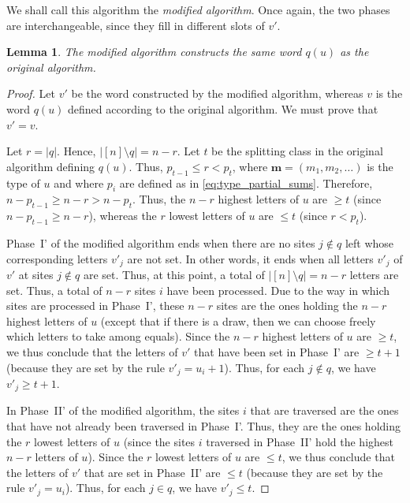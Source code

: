 \documentclass[reqno]{amsart}
\newcommand{\0}{\phantom{c}}
\newcommand{\mm}{\mathbf{m}}
\newcommand{\abs}[1]{\left| #1 \right|}
\newcommand{\tup}[1]{\left( #1 \right)}
\newcommand{\ive}[1]{\left[ #1 \right]}
\newcommand{\defn}[1]{{\color{darkred}\emph{#1}}} %
\theoremstyle{plain}
\newtheorem{lemma}[thm]{Lemma}
\theoremstyle{definition}
\numberwithin{equation}{section}
\begin{document}
We shall call this algorithm the \defn{modified algorithm}.
Once again, the two phases are interchangeable, since they fill in different slots of $v'$.

\begin{lemma}
  \label{le:modalg}
  The modified algorithm constructs the same word $q \tup{u}$ as the original algorithm.
\end{lemma}

\begin{proof}
Let $v'$ be the word constructed by the modified algorithm,
whereas $v$ is the word $q \tup{u}$ defined according to the original algorithm.
We must prove that $v' = v$.

Let $r = \abs{q}$. Hence, $\abs{\ive{n} \setminus q} = n-r$.
Let $t$ be the splitting class in the original algorithm defining $q \tup{u}$.
Thus, $p_{t-1} \leq r < p_t$,
where $\mm = \tup{m_1, m_2, \ldots}$ is the type of $u$ and where $p_i$ are defined as in \eqref{eq:type_partial_sums}.
Therefore, $n-p_{t-1} \geq n-r > n-p_t$.
Thus, the $n-r$ highest letters of $u$ are $\geq t$ (since $n-p_{t-1} \geq n-r$),
whereas the $r$ lowest letters of $u$ are $\leq t$ (since $r < p_t$).

Phase~I' of the modified algorithm ends when there are no sites $j \notin q$ left whose corresponding letters $v'_j$ are not set. In other words, it ends when all letters $v'_j$ of $v'$ at sites $j \notin q$ are set. Thus, at this point, a total of $\abs{\ive{n} \setminus q} = n - r$ letters are set. Thus, a total of $n-r$ sites $i$ have been processed. Due to the way in which sites are processed in Phase~I', these $n-r$ sites are the ones holding the $n-r$ highest letters of $u$ (except that if there is a draw, then we can choose freely which letters to take among equals). Since the $n-r$ highest letters of $u$ are $\geq t$, we thus conclude that the letters of $v'$ that have been set in Phase~I' are $\geq t+1$ (because they are set by the rule $v'_j = u_i + 1$). Thus, for each $j \notin q$, we have $v'_j \geq t+1$.

In Phase~II' of the modified algorithm, the sites $i$ that are traversed are the ones that have not already been traversed in Phase~I'. Thus, they are the ones holding the $r$ lowest letters of $u$ (since the sites $i$ traversed in Phase~II' hold the highest $n-r$ letters of $u$). Since the $r$ lowest letters of $u$ are $\leq t$, we thus conclude that the letters of $v'$ that are set in Phase~II' are $\leq t$ (because they are set by the rule $v'_j = u_i$). Thus, for each $j \in q$, we have $v'_j \leq t$.


\end{proof}
\end{document}
